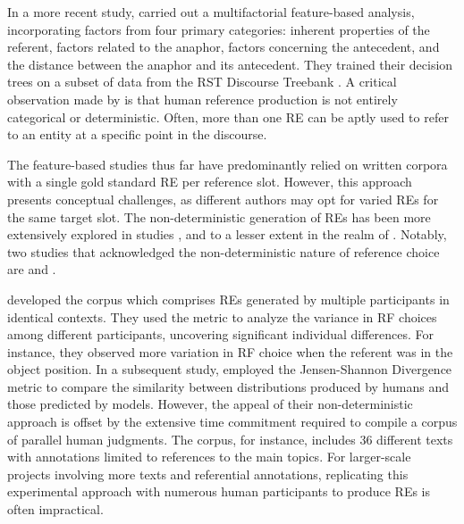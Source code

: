 \begin{sloppypar}
In a more recent study, \citet{kibrik2016referential} carried out a multifactorial feature-based analysis, incorporating factors from four primary categories: inherent properties of the referent, factors related to the anaphor, factors concerning the antecedent, and the distance between the anaphor and its antecedent. They trained their decision trees on a subset of data from the RST Discourse Treebank \citep{Carlson2002}. A critical observation made by \citet{kibrik2016referential} is that human reference production is not entirely categorical or deterministic. Often, more than one RE can be aptly used to refer to an entity at a specific point in the discourse.
\end{sloppypar}

The feature-based \context studies thus far have predominantly relied on written corpora with a single gold standard RE per reference slot. However, this approach presents conceptual challenges, as different authors may opt for varied REs for the same target slot. The non-deterministic generation of REs has been more extensively explored in \shot studies \citep{gatt2013we, van2016computational, Gompel2019}, and to a lesser extent in the realm of \context. Notably, two \context studies that acknowledged the non-deterministic nature of reference choice are \citet{castro-ferreira-etal-2016-individual} and \citet{castro-ferreira-etal-2016-towards-variation}.

\citet{castro-ferreira-etal-2016-individual} developed the  corpus which comprises REs generated by multiple participants in identical contexts. They used the  metric to analyze the variance in RF choices among different participants, uncovering significant individual differences. For instance, they observed more variation in RF choice when the referent was in the object position. In a subsequent study, \citet{castro-ferreira-etal-2016-towards-variation} employed the Jensen-Shannon Divergence metric to compare the similarity between distributions produced by humans and those predicted by models. However, the appeal of their non-deterministic approach is offset by the extensive time commitment required to compile a corpus of parallel human judgments. The  corpus, for instance, includes 36 different texts with annotations limited to references to the main topics. For larger-scale projects involving more texts and referential annotations, replicating this experimental approach with numerous human participants to produce REs is often impractical.


